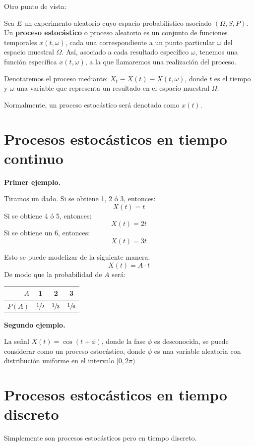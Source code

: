 \documentclass[a4paper]{book}
\numberwithin{figure}{section}
\numberwithin{equation}{subsection}
\numberwithin{figure}{chapter}
\theoremstyle{definition}
\begin{document}
Otro punto de vista:

Sea $E$ un experimento aleatorio cuyo espacio probabilístico asociado $(\Omega , S, P)$. Un \textbf{proceso estocástico} o proceso aleatorio es un conjunto de funciones temporales $x(t,\omega )$, cada una correspondiente a un punto particular $\omega$ del espacio muestral $\Omega$. Así, asociado a cada resultado específico $\omega$, tenemos una función específica $x(t,\omega )$, a la que llamaremos una realización del proceso.

Denotaremos el proceso mediante: $X_t\equiv X(t) \equiv X(t,\omega )$, donde $t$ es el tiempo y $\omega$ una variable que representa un resultado en el espacio muestral $\Omega$.

Normalmente, un proceso estocástico será denotado como $x(t)$.

\section{Procesos estocásticos en tiempo continuo}
\textbf{Primer ejemplo.}

Tiramos un dado. Si se obtiene 1, 2 ó 3, entonces:
\[X(t) = t\]
Si se obtiene 4 ó 5, entonces:
\[X(t) = 2t\]
Si se obtiene un 6, entonces:
\[X(t) = 3t\]

Esto se puede modelizar de la siguiente manera:
\[X(t) = A\cdot t\]
De modo que la probabilidad de $A$ será:
\begin{center}
	\begin{tabular}{r || c | c | c}
		$A$    & 1              & 2              & 3              \\ \hline
		$P(A)$ & $\sfrac{1}{2}$ & $\sfrac{1}{3}$ & $\sfrac{1}{6}$
	\end{tabular}
\end{center}

\textbf{Segundo ejemplo.}

La señal $X(t) = \cos\left( t+\phi \right)$, donde la fase $\phi$ es desconocida, se puede considerar como un proceso estocástico, donde $\phi$ es una variable aleatoria con distribución uniforme en el intervalo $[0, 2\pi )$




\section{Procesos estocásticos en tiempo discreto}

Simplemente son procesos estocásticos pero en tiempo discreto.
\end{document}
